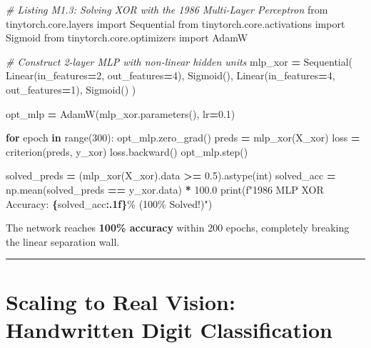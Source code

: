 \documentclass[
  letterpaper,
]{scrbook}
\newenvironment{Shaded}{\begin{snugshade}}{\end{snugshade}}
\newcommand{\BuiltInTok}[1]{#1}
\newcommand{\CommentTok}[1]{\textcolor[rgb]{0.56,0.35,0.01}{\textit{#1}}}
\newcommand{\ControlFlowTok}[1]{\textcolor[rgb]{0.13,0.29,0.53}{\textbf{#1}}}
\newcommand{\DecValTok}[1]{\textcolor[rgb]{0.00,0.00,0.81}{#1}}
\newcommand{\FloatTok}[1]{\textcolor[rgb]{0.00,0.00,0.81}{#1}}
\newcommand{\ImportTok}[1]{#1}
\newcommand{\KeywordTok}[1]{\textcolor[rgb]{0.13,0.29,0.53}{\textbf{#1}}}
\newcommand{\NormalTok}[1]{#1}
\newcommand{\OperatorTok}[1]{\textcolor[rgb]{0.81,0.36,0.00}{\textbf{#1}}}
\newcommand{\SpecialCharTok}[1]{\textcolor[rgb]{0.81,0.36,0.00}{\textbf{#1}}}
\newcommand{\SpecialStringTok}[1]{\textcolor[rgb]{0.31,0.60,0.02}{#1}}
\begin{document}
\begin{Shaded}
\begin{Highlighting}[]
\CommentTok{\# Listing M1.3: Solving XOR with the 1986 Multi{-}Layer Perceptron}
\ImportTok{from}\NormalTok{ tinytorch.core.layers }\ImportTok{import}\NormalTok{ Sequential}
\ImportTok{from}\NormalTok{ tinytorch.core.activations }\ImportTok{import}\NormalTok{ Sigmoid}
\ImportTok{from}\NormalTok{ tinytorch.core.optimizers }\ImportTok{import}\NormalTok{ AdamW}

\CommentTok{\# Construct 2{-}layer MLP with non{-}linear hidden units}
\NormalTok{mlp\_xor }\OperatorTok{=}\NormalTok{ Sequential(}
\NormalTok{    Linear(in\_features}\OperatorTok{=}\DecValTok{2}\NormalTok{, out\_features}\OperatorTok{=}\DecValTok{4}\NormalTok{),}
\NormalTok{    Sigmoid(),}
\NormalTok{    Linear(in\_features}\OperatorTok{=}\DecValTok{4}\NormalTok{, out\_features}\OperatorTok{=}\DecValTok{1}\NormalTok{),}
\NormalTok{    Sigmoid()}
\NormalTok{)}

\NormalTok{opt\_mlp }\OperatorTok{=}\NormalTok{ AdamW(mlp\_xor.parameters(), lr}\OperatorTok{=}\FloatTok{0.1}\NormalTok{)}

\ControlFlowTok{for}\NormalTok{ epoch }\KeywordTok{in} \BuiltInTok{range}\NormalTok{(}\DecValTok{300}\NormalTok{):}
\NormalTok{    opt\_mlp.zero\_grad()}
\NormalTok{    preds }\OperatorTok{=}\NormalTok{ mlp\_xor(X\_xor)}
\NormalTok{    loss }\OperatorTok{=}\NormalTok{ criterion(preds, y\_xor)}
\NormalTok{    loss.backward()}
\NormalTok{    opt\_mlp.step()}

\NormalTok{solved\_preds }\OperatorTok{=}\NormalTok{ (mlp\_xor(X\_xor).data }\OperatorTok{\textgreater{}=} \FloatTok{0.5}\NormalTok{).astype(}\BuiltInTok{int}\NormalTok{)}
\NormalTok{solved\_acc }\OperatorTok{=}\NormalTok{ np.mean(solved\_preds }\OperatorTok{==}\NormalTok{ y\_xor.data) }\OperatorTok{*} \FloatTok{100.0}
\BuiltInTok{print}\NormalTok{(}\SpecialStringTok{f"1986 MLP XOR Accuracy: }\SpecialCharTok{\{}\NormalTok{solved\_acc}\SpecialCharTok{:.1f\}}\SpecialStringTok{\% (100\% Solved!)"}\NormalTok{)}
\end{Highlighting}
\end{Shaded}

The network reaches \textbf{100\% accuracy} within 200 epochs,
completely breaking the linear separation wall.

\begin{center}\rule{0.5\linewidth}{0.5pt}\end{center}

\section*{Scaling to Real Vision: Handwritten Digit
Classification}\label{scaling-to-real-vision-handwritten-digit-classification}
\end{document}
